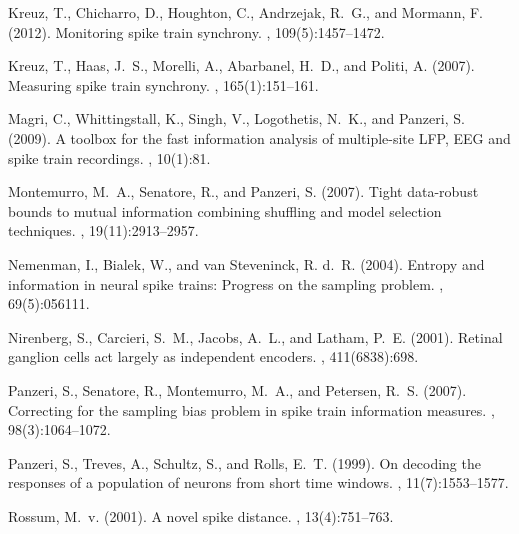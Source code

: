 \documentclass[12pt]{article}
\begin{document}
\begin{thebibliography}{}
Kreuz, T., Chicharro, D., Houghton, C., Andrzejak, R.~G., and Mormann, F.
  (2012).
\newblock Monitoring spike train synchrony.
, 109(5):1457--1472.

Kreuz, T., Haas, J.~S., Morelli, A., Abarbanel, H.~D., and Politi, A. (2007).
\newblock Measuring spike train synchrony.
, 165(1):151--161.

Magri, C., Whittingstall, K., Singh, V., Logothetis, N.~K., and Panzeri, S.
  (2009).
\newblock A toolbox for the fast information analysis of multiple-site {LFP},
  {EEG} and spike train recordings.
, 10(1):81.

Montemurro, M.~A., Senatore, R., and Panzeri, S. (2007).
\newblock Tight data-robust bounds to mutual information combining shuffling
  and model selection techniques.
, 19(11):2913--2957.

Nemenman, I., Bialek, W., and van Steveninck, R. d.~R. (2004).
\newblock Entropy and information in neural spike trains: Progress on the
  sampling problem.
, 69(5):056111.

Nirenberg, S., Carcieri, S.~M., Jacobs, A.~L., and Latham, P.~E. (2001).
\newblock Retinal ganglion cells act largely as independent encoders.
, 411(6838):698.

Panzeri, S., Senatore, R., Montemurro, M.~A., and Petersen, R.~S. (2007).
\newblock Correcting for the sampling bias problem in spike train information
  measures.
, 98(3):1064--1072.

Panzeri, S., Treves, A., Schultz, S., and Rolls, E.~T. (1999).
\newblock On decoding the responses of a population of neurons from short time
  windows.
, 11(7):1553--1577.

Rossum, M.~v. (2001).
\newblock A novel spike distance.
, 13(4):751--763.


\end{thebibliography}
\end{document}
